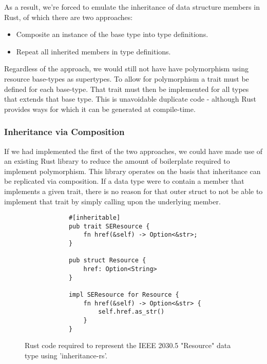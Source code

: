 As a result, we're forced to emulate the inheritance of data structure members in Rust, of which there are two approaches:

\begin{itemize}
    \item Composite an instance of the base type into type definitions.
    \item Repeat all inherited members in type definitions.
\end{itemize}

Regardless of the approach, we would still not have have polymorphism using resource base-types as supertypes.
To allow for polymorphism a trait must be defined for each base-type. That trait must then be implemented for all types that extends that base type. 
This is unavoidable duplicate code - although Rust provides ways for which it can be generated at compile-time.

\subsubsection{Inheritance via Composition}

If we had implemented the first of the two approaches, we could have made use of an existing Rust library to reduce the amount of boilerplate required to implement polymorphism.
This library operates on the basis that inheritance can be replicated via composition. If a data type were to contain a member that implements a given trait, there is no reason for that outer struct to not be able to implement that trait by simply calling upon the underlying member.


\begin{figure}[H]
    \begin{center}
        \begin{lstlisting}
            #[inheritable]
            pub trait SEResource {
                fn href(&self) -> Option<&str>;
            }

            pub struct Resource {
                href: Option<String>
            }

            impl SEResource for Resource {
                fn href(&self) -> Option<&str> {
                    self.href.as_str()
                }
            }
        \end{lstlisting}
        \label{fig:resinher}
        \caption{Rust code required to represent the IEEE 2030.5 "Resource" data type using 'inheritance-rs'.}
    \end{center}
\end{figure}

